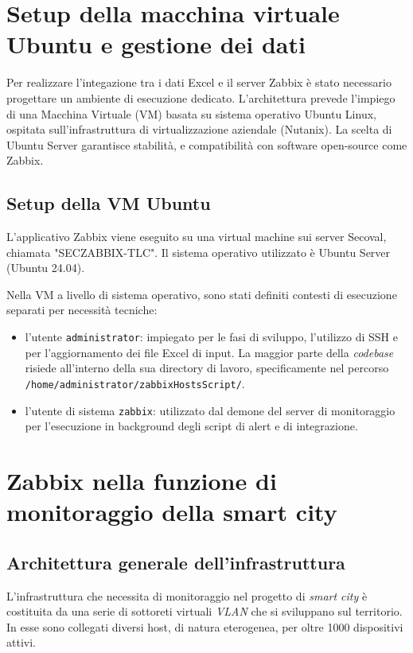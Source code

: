 \documentclass[12pt, a4paper, oneside]{report}
\begin{document}
\section{Setup della macchina virtuale Ubuntu e gestione dei dati}

Per realizzare l'integazione tra i dati Excel e il server Zabbix è stato necessario progettare un ambiente di esecuzione dedicato. L'architettura prevede l'impiego di una Macchina Virtuale (VM) basata su sistema operativo Ubuntu Linux, ospitata sull'infrastruttura di virtualizzazione aziendale (Nutanix). La scelta di Ubuntu Server garantisce stabilità, e  compatibilità con software open-source come Zabbix.

\subsection{Setup della VM Ubuntu}
L'applicativo Zabbix viene eseguito su una virtual machine sui server Secoval, chiamata
"SECZABBIX-TLC". Il sistema operativo utilizzato è Ubuntu Server (Ubuntu 24.04).

Nella VM a livello di sistema operativo, sono stati definiti contesti di esecuzione separati per necessità tecniche:
\begin{itemize}
    \item l'utente \texttt{administrator}: impiegato per le fasi di sviluppo, l'utilizzo di SSH e per l'aggiornamento dei file Excel di input. La maggior parte della \textit{codebase} risiede all'interno della sua directory di lavoro, specificamente nel percorso \\\texttt{/home/administrator/zabbixHostsScript/}.
    \item l'utente di sistema \texttt{zabbix}: utilizzato dal demone del server di monitoraggio per l'esecuzione in background degli script di alert e di integrazione.
\end{itemize}

\section{Zabbix nella funzione di monitoraggio della smart city}
\subsection{Architettura generale dell'infrastruttura}
L'infrastruttura che necessita di monitoraggio nel progetto di \emph{smart city}
è costituita da una serie di sottoreti virtuali \emph{VLAN} che si sviluppano sul territorio. In esse sono collegati diversi host, di natura eterogenea,
per oltre 1000 dispositivi attivi.
\end{document}

